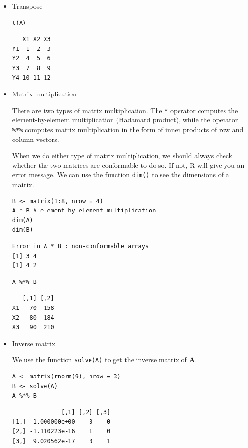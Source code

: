 \documentclass[a4paper,11pt]{article}
\begin{document}
\begin{itemize}
\item Transpose
\label{sec:org2d07021}

\begin{verbatim}
t(A)
\end{verbatim}

\begin{verbatim}
   X1 X2 X3
Y1  1  2  3
Y2  4  5  6
Y3  7  8  9
Y4 10 11 12
\end{verbatim}

\item Matrix multiplication
\label{sec:orge946c7a}

There are two types of matrix multiplication. The \texttt{*} operator
computes the element-by-element multiplication (Hadamard product),
while the operator \texttt{\%*\%} computes matrix multiplication in the form of
inner products of row and column vectors.

When we do either type of matrix multiplication, we should always
check whether the two matrices are conformable to do so. If not, R
will give you an error message. We can use the function \texttt{dim()} to see
the dimensions of a matrix.

\begin{verbatim}
B <- matrix(1:8, nrow = 4)
A * B # element-by-element multiplication
dim(A)
dim(B)
\end{verbatim}

\begin{verbatim}
Error in A * B : non-conformable arrays
[1] 3 4
[1] 4 2
\end{verbatim}

\begin{verbatim}
A %*% B
\end{verbatim}

\begin{verbatim}
   [,1] [,2]
X1   70  158
X2   80  184
X3   90  210
\end{verbatim}

\item Inverse matrix
\label{sec:org3aab382}

We use the function \texttt{solve(A)} to get the inverse matrix of
\(\mathbf{A}\).

\begin{verbatim}
A <- matrix(rnorm(9), nrow = 3)
B <- solve(A)
A %*% B
\end{verbatim}

\begin{verbatim}
              [,1] [,2] [,3]
[1,]  1.000000e+00    0    0
[2,] -1.110223e-16    1    0
[3,]  9.020562e-17    0    1
\end{verbatim}


\end{itemize}
\end{document}
